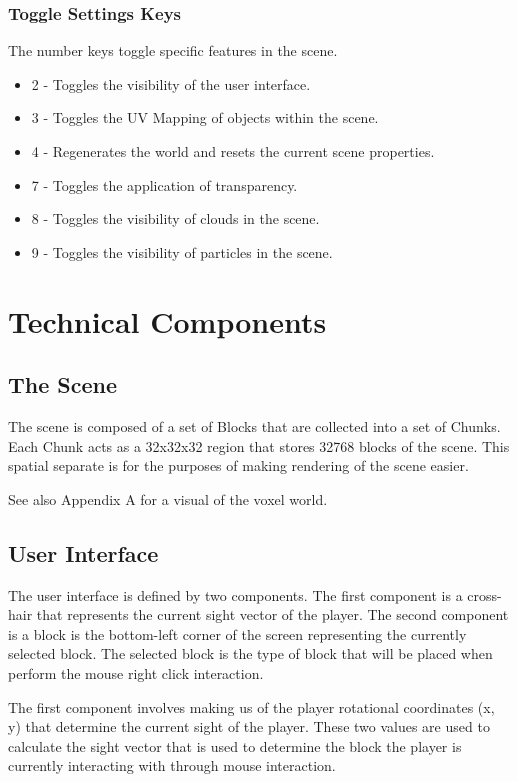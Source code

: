 \documentclass{book}
\begin{document}
\subsection{Toggle Settings Keys}
The number keys toggle specific features in the scene.
      
\begin{itemize}
	\item 2 - Toggles the visibility of the user interface.
	\item 3 - Toggles the UV Mapping of objects within the scene.
	\item 4 - Regenerates the world and resets the current scene properties.
	\item 7 - Toggles the application of transparency.
	\item 8 - Toggles the visibility of clouds in the scene.
	\item 9 - Toggles the visibility of particles in the scene.
\end{itemize}

\chapter{Technical Components}
\section{The Scene}
The scene is composed of a set of Blocks that are collected into a set of Chunks.  Each Chunk acts as a 32x32x32 region that stores 32768 blocks of the scene.  This spatial separate is for the purposes of making rendering of the scene easier. 
  
See also Appendix A for a visual of the voxel world.
  
\section{User Interface}
The user interface is defined by two components.  The first component is a cross-hair that represents the current sight vector of the player.  The second component is a block is the bottom-left corner of the screen representing the currently selected block.  The selected block is the type of block that will be placed when perform the mouse right click interaction.
    
The first component involves making us of the player rotational coordinates (x, y) that determine the current sight of the player.  These two values are used to calculate the sight vector that is used to determine the block the player is currently interacting with through mouse interaction.
    
\end{document}
